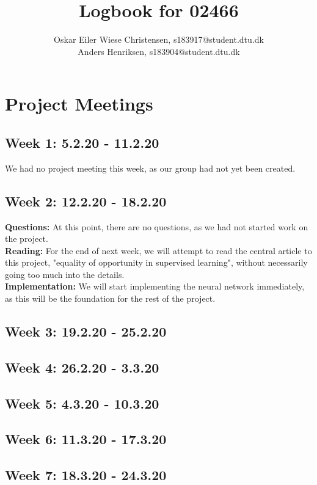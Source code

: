 \documentclass[11pt, fleqn]{article}
\title{Logbook for 02466}
\author{Oskar Eiler Wiese Christensen, s183917@student.dtu.dk \\ Anders Henriksen, s183904@student.dtu.dk}
\begin{document}
	\maketitle
	
\section*{Project Meetings}

\subsection*{Week 1: 5.2.20 - 11.2.20}
We had no project meeting this week, as our group had not yet been created.

\subsection*{Week 2: 12.2.20 - 18.2.20}
\textbf{Questions:} At this point, there are no questions, as we had not started work on the project. \\
\textbf{Reading:} For the end of next week, we will attempt to read the central article to this project, "equality of opportunity in supervised learning", without necessarily going too much into the details. \\
\textbf{Implementation:} We will start implementing the neural network immediately, as this will be the foundation for the rest of the project.

\subsection*{Week 3: 19.2.20 - 25.2.20}


\subsection*{Week 4: 26.2.20 - 3.3.20}


\subsection*{Week 5: 4.3.20 - 10.3.20}


\subsection*{Week 6: 11.3.20 - 17.3.20}


\subsection*{Week 7: 18.3.20 - 24.3.20}
\end{document}
